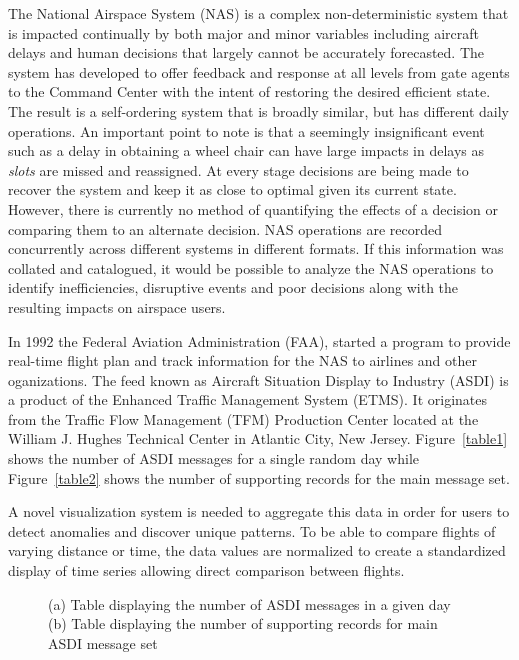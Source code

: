 \documentclass{sig-alternate}
\begin{document}
The National Airspace System (NAS) is a complex non-deterministic system that
is impacted continually by both major and minor variables including aircraft
delays and human decisions that largely cannot be accurately forecasted.
The system has developed to offer feedback and response at all levels from
gate agents to the Command Center with the intent of restoring the desired
efficient state. The result is a self-ordering system that is broadly
similar, but has different daily operations. An important point to note is that
a seemingly insignificant event such as
a delay in obtaining a wheel chair can have large impacts in delays
as \emph{slots} are missed and reassigned. At every stage decisions are being
made to recover the system and keep it as close to optimal given its current
state. However, there is currently no method of quantifying the effects of 
a decision or comparing them to an alternate decision. NAS operations
are recorded concurrently across different systems in different formats.
If this information was collated and catalogued, it would be possible
to analyze the NAS operations to identify inefficiencies, disruptive events 
and poor decisions along with the resulting impacts on airspace users.

In 1992 the Federal Aviation Administration (FAA), started a program to provide
real-time flight plan and track information for the NAS to airlines and other
oganizations. The feed known as Aircraft Situation Display to Industry (ASDI) is a 
product of the Enhanced Traffic Management System (ETMS). It originates from
the Traffic Flow Management (TFM) Production Center located at the William
J. Hughes Technical Center in Atlantic City, New Jersey. Figure~\ref{table1} shows the 
number of ASDI messages for a single random day while Figure~\ref{table2} shows the number
of supporting records for the main message set.


A novel visualization system is needed to aggregate this data in order for 
users to detect anomalies and discover unique patterns. To be able to compare 
flights of varying distance or time, the data values are normalized to 
create a standardized display of time series allowing direct comparison between
flights. 

\newcommand{\incfig}[2]{\texttt{[image: figs/\#1]}\label{#1}}

\begin{figure}
\centering
\subfloat[]{\incfig{table1}{width=1\columnwidth}}\hfill
\subfloat[]{\incfig{table2}{width=1\columnwidth}}
\caption{
(a) Table displaying the number of ASDI messages in a given day
(b) Table displaying the number of supporting records for main ASDI message set
}
\label{two-tables}
\end{figure}
\end{document}

